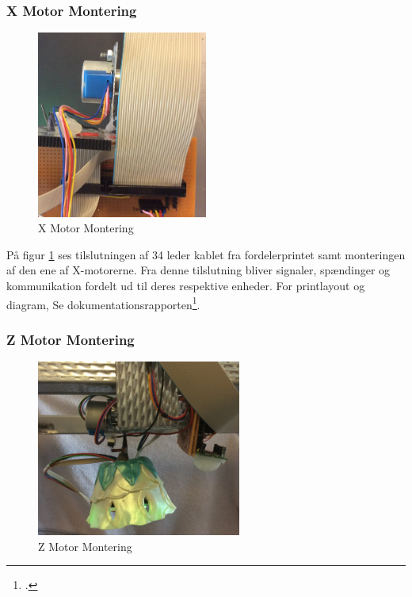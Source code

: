 \subsubsection{X Motor Montering}
\begin{figure}[H] \centering
    \includegraphics[width=0.5\textwidth]{Filer/XMotorMont.PNG}
    \caption{X Motor Montering}
    \label{fig:XMotorMont}
\end{figure}

På figur \ref{fig:XMotorMont} ses tilslutningen af 34 leder kablet fra fordelerprintet samt monteringen af den ene af X-motorerne. Fra denne tilslutning bliver signaler, spændinger og kommunikation fordelt ud til deres respektive enheder. For printlayout og diagram, Se dokumentationsrapporten\footcite{documentation}.

\subsubsection{Z Motor Montering}
\begin{figure}[H] \centering
    \includegraphics[width=0.6\textwidth]{Filer/ZMotorMont.PNG}
    \caption{Z Motor Montering}
    \label{fig:ZMotorMont}
\end{figure}

